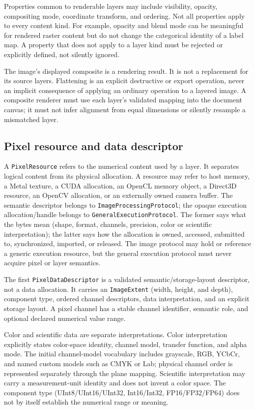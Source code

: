 \documentclass[11pt,a4paper,oneside]{article}
\newcommand{\PixelResource}{\texttt{PixelResource}}
\begin{document}
Properties common to renderable layers may include visibility, opacity, compositing mode, coordinate transform, and ordering. Not all properties apply to every content kind. For example, opacity and blend mode can be meaningful for rendered raster content but do not change the categorical identity of a label map. A property that does not apply to a layer kind must be rejected or explicitly defined, not silently ignored.

The image's displayed composite is a rendering result. It is not a replacement for its source layers. Flattening is an explicit destructive or export operation, never an implicit consequence of applying an ordinary operation to a layered image. A composite renderer must use each layer's validated mapping into the document canvas; it must not infer alignment from equal dimensions or silently resample a mismatched layer.

\subsection{Pixel resource and data descriptor}

A \PixelResource{} refers to the numerical content used by a layer. It separates logical content from its physical allocation. A resource may refer to host memory, a Metal texture, a CUDA allocation, an OpenCL memory object, a Direct3D resource, an OpenCV allocation, or an externally owned camera buffer. The semantic descriptor belongs to \texttt{ImageProcessing\allowbreak Protocol}; the opaque execution allocation/handle belongs to \texttt{GeneralExecution\allowbreak Protocol}. The former says what the bytes mean (shape, format, channels, precision, color or scientific interpretation); the latter says how the allocation is owned, accessed, submitted to, synchronized, imported, or released. The image protocol may hold or reference a generic execution resource, but the general execution protocol must never acquire pixel or layer semantics.

The first \texttt{PixelDataDescriptor} is a validated semantic/storage-layout descriptor, not a data allocation. It carries an \texttt{ImageExtent} (width, height, and depth), component type, ordered channel descriptors, data interpretation, and an explicit storage layout. A pixel channel has a stable channel identifier, semantic role, and optional declared numerical value range.

Color and scientific data are separate interpretations. Color interpretation explicitly states color-space identity, channel model, transfer function, and alpha mode. The initial channel-model vocabulary includes grayscale, RGB, YCbCr, and named custom models such as CMYK or Lab; physical channel order is represented separately through the plane mapping. Scientific interpretation may carry a measurement-unit identity and does not invent a color space. The component type (UInt8/UInt16/UInt32, Int16/Int32, FP16/FP32/FP64) does not by itself establish the numerical range or meaning.
\end{document}
